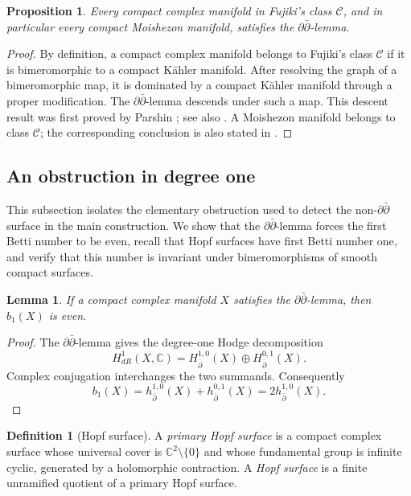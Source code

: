 \documentclass[11pt]{amsart}
\numberwithin{equation}{section}
\def\mc{\mathcal}
\def\mb{\mathbb}
\theoremstyle{plain}
\newtheorem{lemma}[thm]{Lemma}
\newtheorem{prop}[thm]{Proposition}
\theoremstyle{definition}
\newtheorem{defn}[thm]{Definition}
\begin{document}
\begin{prop}\label{prop-moishezon-ddbar}
Every compact complex manifold in Fujiki's class $\mc C$, and in particular
every compact Moishezon manifold, satisfies the
$\partial\bar\partial$-lemma.
\end{prop}

\begin{proof}
By definition, a compact complex manifold belongs to Fujiki's class $\mc C$ if it is
bimeromorphic to a compact K\"ahler manifold.  After resolving the graph of a
bimeromorphic map, it is dominated by a compact K\"ahler manifold through a
proper modification.  The $\partial\bar\partial$-lemma descends under such a
map.  This descent result was first proved by Parshin
\cite[\S\S~4 and 5]{Pr66}; see also \cite[Theorem 5.22]{DGMS75}.  A
Moishezon manifold belongs to class $\mc C$; the corresponding conclusion is
also stated in \cite[Corollary 5.23]{DGMS75}.
\end{proof}

\subsection{An obstruction in degree one}

This subsection isolates the elementary obstruction used to detect the
non-$\partial\bar\partial$ surface in the main construction.  We show that
the $\partial\bar\partial$-lemma forces the first Betti number to be even,
recall that Hopf surfaces have first Betti number one, and verify that this
number is invariant under bimeromorphisms of smooth compact surfaces.

\begin{lemma}\label{odd-b1}
If a compact complex manifold $X$ satisfies the
$\partial\bar\partial$-lemma, then $b_1(X)$ is even.
\end{lemma}

\begin{proof}
The $\partial\bar\partial$-lemma gives the degree-one Hodge decomposition
\begin{equation*}%
 H^1_{dR}(X,\mb C)
 =H^{1,0}_{\bar\partial}(X)\oplus H^{0,1}_{\bar\partial}(X).
\end{equation*}
Complex conjugation interchanges the two summands.  Consequently
\[
 b_1(X)=h^{1,0}_{\bar\partial}(X)+h^{0,1}_{\bar\partial}(X)
       =2h^{1,0}_{\bar\partial}(X).
\]
\end{proof}

\begin{defn}[Hopf surface]\label{def-Hopf}
A \emph{primary Hopf surface} is a compact complex surface whose universal
cover is $\mb C^2\setminus\{0\}$ and whose fundamental group is infinite
cyclic, generated by a holomorphic contraction.  A \emph{Hopf surface} is a
finite unramified quotient of a primary Hopf surface.
\end{defn}
\end{document}
